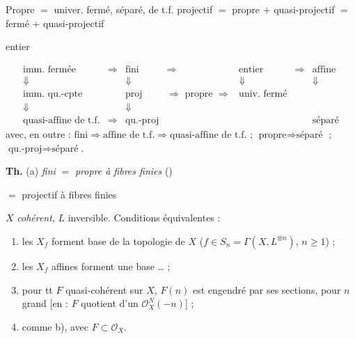 \documentclass[11pt,a4paper]{article}
\begin{document}
Propre $=$ univer. fermé, séparé, de t.f. \qquad projectif $=$ propre $+$ quasi-projectif $=$ \struck{\ill{}} fermé $+$ quasi-projectif

entier


\[
\begin{array}{ccccccc}
\text{imm. fermée} & \Longrightarrow & \text{fini} & \Longrightarrow & \text{entier} & \Longrightarrow & \text{affine} \\
\Downarrow & & \Downarrow & & \Downarrow & & \Downarrow \\
\text{imm. qu.-cpte} & & \text{proj} & \Longrightarrow \text{ propre } \Longrightarrow & \text{univ. fermé} & & \\
\Downarrow & & \Downarrow & & & & \\
\text{quasi-affine de t.f.} & \Longrightarrow & \text{qu.-proj} & & & & \text{séparé}
\end{array}
\]
avec, en outre : $\text{fini} \Rightarrow \text{affine de t.f.} \Rightarrow \text{quasi-affine de t.f.}$ ; $\text{propre} \Rightarrow \text{séparé}$ ; $\text{qu.-proj} \Rightarrow \text{séparé}$.

\textbf{Th.} (a) \emph{fini} $=$ \emph{propre à fibres finies} ()

$=$ projectif à fibres finies



$X$ \emph{cohérent}, $L$ inversible. Conditions équivalentes :

\begin{enumerate}
  \item[a)] les $X_f$ forment base de la topologie de $X$ \quad ($f \in S_n = \Gamma(X, L^{\otimes n})$, $n \geqslant 1$) ;
  \item[a')] les $X_f$ affines forment une base … ;
  \item[b)] pour tt $F$ quasi-cohérent  sur $X$, $F(n)$ est engendré par ses sections, pour $n$ grand [en  : $F$ quotient d'un $\mathcal{O}_X^N(-n)$] ;
  \item[b')] comme b), avec $F \subset \mathcal{O}_X$.
\end{enumerate}
\end{document}
